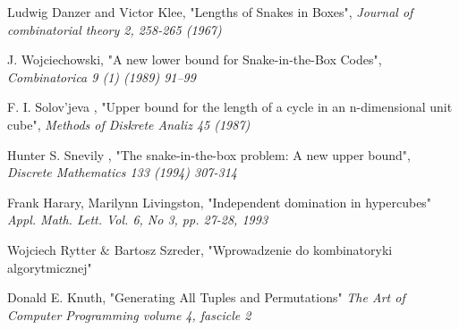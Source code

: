 \documentclass{pracamgr}
\begin{document}
\begin{thebibliography}{99}
   Ludwig Danzer and Victor Klee,
   "Lengths of Snakes in Boxes",
   \textit{Journal of combinatorial theory 2, 258-265 (1967)}

   J. Wojciechowski,
   "A new lower bound for Snake-in-the-Box Codes",
   \textit{Combinatorica 9 (1) (1989) 91--99}
  
   F. I. Solov'jeva ,
   "Upper bound for the length of a cycle in an n-dimensional unit cube",
   \textit{Methods of Diskrete Analiz 45 (1987)}

   Hunter S. Snevily ,
   "The snake-in-the-box problem: A new upper bound",
   \textit{Discrete Mathematics 133 (1994) 307-314}
   
   
   Frank Harary, Marilynn Livingston,
   "Independent domination in hypercubes"
   \textit{Appl. Math. Lett. Vol. 6, No 3, pp. 27-28, 1993}
   
   Wojciech Rytter $\&$ Bartosz Szreder,
   "Wprowadzenie do kombinatoryki algorytmicznej"
   
   Donald E. Knuth,
   "Generating All Tuples and Permutations"
   \textit{The Art of Computer Programming volume 4, fascicle 2}
   
\end{thebibliography}
\end{document}
